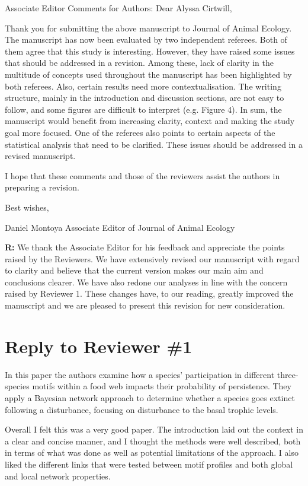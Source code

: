 \documentclass[12pt]{article}
\newenvironment{refquote}{\bigskip \begin{it}}{\end{it}\medskip}
\begin{document}
    \begin{refquote}

        Associate Editor Comments for Authors:
        Dear Alyssa Cirtwill,

        Thank you for submitting the above manuscript to Journal of Animal Ecology. The manuscript has now been evaluated by two independent referees. Both of them agree that this study is interesting. However, they have raised some issues that should be addressed in a revision. Among these, lack of clarity in the multitude of concepts used throughout the manuscript has been highlighted by both referees. Also, certain results need more contextualisation. The writing structure, mainly in the introduction and discussion sections, are not easy to follow, and some figures are difficult to interpret (e.g. Figure 4). In sum, the manuscript would benefit from increasing clarity, context and making the study goal more focused. One of the referees also points to certain aspects of the statistical analysis that need to be clarified. These issues should be addressed in a revised manuscript.

        I hope that these comments and those of the reviewers assist the authors in preparing a revision.

        Best wishes,

        Daniel Montoya
        Associate Editor of Journal of Animal Ecology

    \end{refquote}


    \textbf{R:} We thank the Associate Editor for his feedback and appreciate the points raised by the Reviewers. We have extensively revised our manuscript with regard to clarity and believe that the current version makes our main aim and conclusions clearer. We have also redone our analyses in line with the concern raised by Reviewer 1. These changes have, to our reading, greatly improved the manuscript and we are pleased to present this revision for new consideration.


\clearpage

\section*{Reply to Reviewer \#1}

    \begin{refquote}

        In this paper the authors examine how a species' participation in different three-species motifs within a food web impacts their probability of persistence. They apply a Bayesian network approach to determine whether a species goes extinct following a disturbance, focusing on disturbance to the basal trophic levels.

        Overall I felt this was a very good paper. The introduction laid out the context in a clear and concise manner, and I thought the methods were well described, both in terms of what was done as well as potential limitations of the approach. I also liked the different links that were tested between motif profiles and both global and local network properties. 

    \end{refquote}
\end{document}
